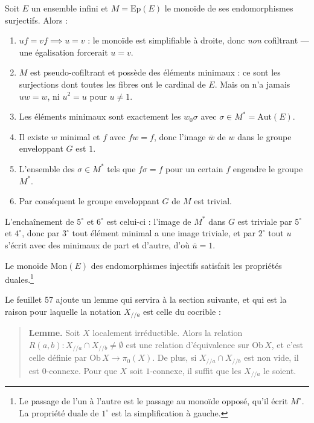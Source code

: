 \documentclass[11pt,a4paper]{article}
\begin{document}
Soit $E$ un ensemble infini et $M = \mathrm{Ep}(E)$ le monoïde de ses
endomorphismes surjectifs. Alors :

\begin{enumerate}
\item[$1^{\circ}$] $uf = vf \implies u = v$ : le monoïde est simplifiable à
droite, donc \emph{non} cofiltrant — une égalisation forcerait $u = v$.
\item[$2^{\circ}$] $M$ est pseudo-cofiltrant et possède des éléments
minimaux : ce sont les surjections dont toutes les fibres ont le cardinal de
$E$. Mais on n'a jamais $uw = w$, ni $u^{2} = u$ pour $u \neq 1$.
\item[$3^{\circ}$] Les éléments minimaux sont exactement les $w_{0}\sigma$
avec $\sigma \in M^{*} = \mathrm{Aut}(E)$.
\item[$4^{\circ}$] Il existe $w$ minimal et $f$ avec $fw = f$, donc l'image
$\overline{w}$ de $w$ dans le groupe enveloppant $G$ est $1$.
\item[$5^{\circ}$] L'ensemble des $\sigma \in M^{*}$ tels que $f\sigma = f$
pour un certain $f$ engendre le groupe $M^{*}$.
\item[$6^{\circ}$] Par conséquent le groupe enveloppant $G$ de $M$ est
trivial.
\end{enumerate}

L'enchaînement de $5^{\circ}$ et $6^{\circ}$ est celui-ci : l'image de $M^{*}$
dans $G$ est triviale par $5^{\circ}$ et $4^{\circ}$, donc par $3^{\circ}$
tout élément minimal a une image triviale, et par $2^{\circ}$ tout $u$
s'écrit avec des minimaux de part et d'autre, d'où $\overline{u} = 1$.

Le monoïde $\mathrm{Mon}(E)$ des endomorphismes injectifs satisfait les
propriétés duales.\footnote{Le passage de l'un à l'autre est le passage au
monoïde opposé, qu'il écrit $M^{\circ}$. La propriété duale de
$1^{\circ}$ est la simplification à gauche.}

Le feuillet 57 ajoute un lemme qui servira à la section suivante, et qui est
la raison pour laquelle la notation $X_{/\!/a}$ est celle du cocrible :

\begin{quote}
\textbf{Lemme.} Soit $X$ localement irréductible. Alors la relation
$R(a,b) : X_{/\!/a} \cap X_{/\!/b} \neq \emptyset$ est une relation
d'équivalence sur $\mathrm{Ob}\,X$, et c'est celle définie par
$\mathrm{Ob}\,X \to \pi_{0}(X)$. De plus, si $X_{/\!/a} \cap X_{/\!/b}$ est
non vide, il est $0$-connexe. Pour que $X$ soit $1$-connexe, il suffit que
les $X_{/\!/a}$ le soient.
\end{quote}
\end{document}
